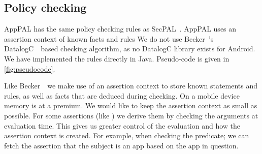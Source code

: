 \documentclass[]{llncs}
\begin{document}
%
%

\subsection{Policy checking}
\label{ssec:eval}

AppPAL has the same policy checking rules as SecPAL~\cite{Becker:2006vh}.
AppPAL uses an assertion context of known facts and rules
We do not use Becker~\etal's DatalogC~\cite{Li:2003ix}~based checking algorithm, as no DatalogC library exists for Android.
We have implemented the rules directly in Java.
Pseudo-code is given in \autoref{fig:pseudocode}.

Like Becker~\etal~we make use of an assertion context to store known statements and rules, as well as facts that are deduced during checking.
On a mobile device memory is at a premium.
We would like to keep the assertion context as small as possible.
For some assertions (like ) we derive them by checking the arguments at evaluation time.
This gives us greater control of the evaluation and how the assertion context is created.
For example, when checking the  predicate;
  we can fetch the assertion that the subject is an app based on the app in question.
\end{document}
